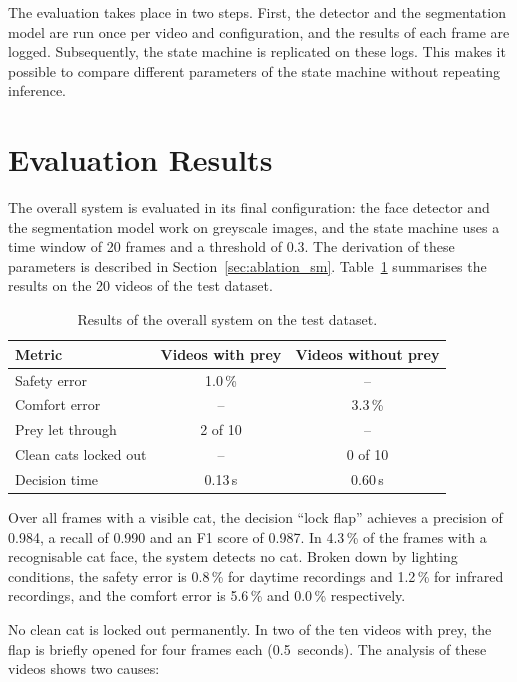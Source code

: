 The evaluation takes place in two steps. First, the detector and the segmentation model are run once per video and configuration, and the results of each frame are logged. Subsequently, the state machine is replicated on these logs. This makes it possible to compare different parameters of the state machine without repeating inference.

\section{Evaluation Results}
The overall system is evaluated in its final configuration: the face detector and the segmentation model work on greyscale images, and the state machine uses a time window of 20 frames and a threshold of 0.3. The derivation of these parameters is described in Section~\ref{sec:ablation_sm}. Table~\ref{tab:system_eval} summarises the results on the 20 videos of the test dataset.

\begin{table}[H]
    \centering
    \begin{tabular}{lcc}
        \toprule
        Metric & Videos with prey & Videos without prey \\
        \midrule
        Safety error & 1.0\,\% & -- \\
        Comfort error & -- & 3.3\,\% \\
        Prey let through & 2 of 10 & -- \\
        Clean cats locked out & -- & 0 of 10 \\
        Decision time & 0.13\,s & 0.60\,s \\
        \bottomrule
    \end{tabular}
    \caption{Results of the overall system on the test dataset.}
    \label{tab:system_eval}
\end{table}

Over all frames with a visible cat, the decision ``lock flap'' achieves a precision of 0.984, a recall of 0.990 and an F1 score of 0.987. In 4.3\,\% of the frames with a recognisable cat face, the system detects no cat. Broken down by lighting conditions, the safety error is 0.8\,\% for daytime recordings and 1.2\,\% for infrared recordings, and the comfort error is 5.6\,\% and 0.0\,\% respectively.

No clean cat is locked out permanently. In two of the ten videos with prey, the flap is briefly opened for four frames each (0.5~seconds). The analysis of these videos shows two causes:

